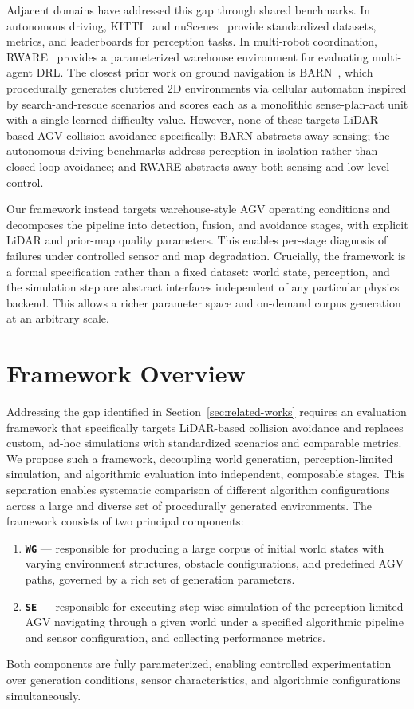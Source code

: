\documentclass[conference]{IEEEtran}
\begin{document}
Adjacent domains have addressed this gap through shared benchmarks. In autonomous driving, KITTI~\cite{geiger2012kitti} and nuScenes~\cite{caesar2020nuscenes} provide standardized datasets, metrics, and leaderboards for perception tasks. In multi-robot coordination, RWARE~\cite{papoudakis2021benchmarking} provides a parameterized warehouse environment for evaluating multi-agent DRL. The closest prior work on ground navigation is BARN~\cite{perille2020barn}, which procedurally generates cluttered 2D environments via cellular automaton inspired by search-and-rescue scenarios and scores each as a monolithic sense-plan-act unit with a single learned difficulty value. However, none of these targets LiDAR-based AGV collision avoidance specifically: BARN abstracts away sensing; the autonomous-driving benchmarks address perception in isolation rather than closed-loop avoidance; and RWARE abstracts away both sensing and low-level control.
 
Our framework instead targets warehouse-style AGV operating conditions and decomposes the pipeline into detection, fusion, and avoidance stages, with explicit LiDAR and prior-map quality parameters. This enables per-stage diagnosis of failures under controlled sensor and map degradation. Crucially, the framework is a formal specification rather than a fixed dataset: world state, perception, and the simulation step are abstract interfaces independent of any particular physics backend. This allows a richer parameter space and on-demand corpus generation at an arbitrary scale.
 
 
\section{Framework Overview}
\label{sec:framework-overview}
Addressing the gap identified in Section~\ref{sec:related-works} requires an evaluation framework that specifically targets LiDAR-based collision avoidance and replaces custom, ad-hoc simulations with standardized scenarios and comparable metrics. We propose such a framework, decoupling world generation, perception-limited simulation, and algorithmic evaluation into independent, composable stages. This separation enables systematic comparison of different algorithm configurations across a large and diverse set of procedurally generated environments.
The framework consists of two principal components:
\begin{enumerate}
    \item \textbf{\texttt{WG}} --- responsible for producing a large corpus of initial world states with varying environment structures, obstacle configurations, and predefined AGV paths, governed by a rich set of generation parameters.
    \item \textbf{\texttt{SE}} --- responsible for executing step-wise simulation of the perception-limited AGV navigating through a given world under a specified algorithmic pipeline and sensor configuration, and collecting performance metrics.
\end{enumerate}
\noindent Both components are fully parameterized, enabling controlled experimentation over generation conditions, sensor characteristics, and algorithmic configurations simultaneously.
 
\end{document}
